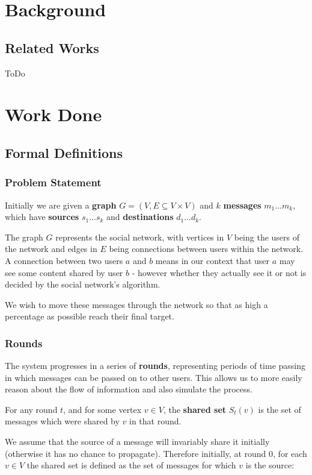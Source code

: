 \documentclass[bsc,frontabs,twoside,singlespacing,parskip,deptreport]{infthesis}     %
\begin{document}
\chapter{Background}
\section{Related Works}
ToDo

\chapter{Work Done}
\section{Formal Definitions}

\subsection{Problem Statement}
Initially we are given a \textbf{graph} $G = (V, E \subseteq V \times V)$ and $k$ \textbf{messages} $ m_{1} ... m_{k}$, which have \textbf{sources} $s_{1} ... s_{k}$ and \textbf{destinations} $d_{1} ... d_{k}$. 

The graph $G$ represents the social network, with vertices in $V$ being the users of the network and edges in $E$ being connections between users within the network. A connection between two users $a$ and $b$ means in our context that user $a$ may see some content shared by user $b$ - however whether they actually see it or not is decided by the social network's algorithm.

We wish to move these messages through the network so that as high a percentage as possible reach their final target.

\subsection{Rounds}
The system progresses in a series of \textbf{rounds}, representing periods of time passing in which messages can be passed on to other users. This allows us to more easily reason about the flow of information and also simulate the process.

For any round $t$, and for some vertex $v \in V$, the \textbf{shared set} $S_{t}(v)$ is the set of messages which were shared by $v$ in that round.

We assume that the source of a message will invariably share it initially (otherwise it has no chance to propagate). Therefore initially, at round 0, for each $v \in V$ the shared set is defined as the set of messages for which $v$ is the source:
\end{document}
